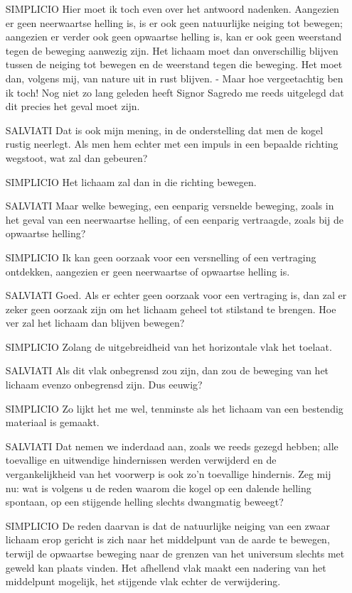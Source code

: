 \documentclass{ximera}
\begin{document}
{\begin{enumerate}
	\item[SIMPLICIO]Hier moet ik toch even over het antwoord nadenken. Aangezien er geen neerwaartse helling is, is er ook geen natuurlijke neiging tot bewegen; aangezien er verder ook geen opwaartse helling is, kan er ook geen weerstand tegen de beweging aanwezig zijn. Het lichaam moet dan onverschillig blijven tussen de neiging tot bewegen en de weerstand tegen die beweging. Het moet dan, volgens mij, van nature uit in rust blijven. - Maar hoe vergeetachtig ben ik toch! Nog niet zo lang geleden heeft Signor Sagredo me reeds uitgelegd dat dit precies het geval moet zijn.
	\item[SALVIATI]Dat is ook mijn mening, in de onderstelling dat men de kogel rustig neerlegt. Als men hem echter met een impuls in een bepaalde richting wegstoot, wat zal dan gebeuren?
	\item[SIMPLICIO]Het lichaam zal dan in die richting bewegen.
	\item[SALVIATI]Maar welke beweging, een eenparig versnelde beweging, zoals in het geval van een neerwaartse helling, of een eenparig vertraagde, zoals bij de opwaartse helling?
	\item[SIMPLICIO]Ik kan geen oorzaak voor een versnelling of een vertraging ontdekken, aangezien er geen neerwaartse of opwaartse helling is.
	\item[SALVIATI]Goed. Als er echter geen oorzaak voor een vertraging is, dan zal er zeker geen oorzaak zijn om het lichaam geheel tot stilstand te brengen. Hoe ver zal het lichaam dan blijven bewegen?
	\item[SIMPLICIO]Zolang de uitgebreidheid van het horizontale vlak het toelaat.
	\item[SALVIATI]Als dit vlak onbegrensd zou zijn, dan zou de beweging van het lichaam evenzo onbegrensd zijn. Dus eeuwig?
	\item[SIMPLICIO]Zo lijkt het me wel, tenminste als het lichaam van een bestendig materiaal is gemaakt.
	\item[SALVIATI]Dat nemen we inderdaad aan, zoals we reeds gezegd hebben; alle toevallige en uitwendige hindernissen werden verwijderd en de vergankelijkheid van het voorwerp is ook zo'n toevallige hindernis. Zeg mij nu: wat is volgens u de reden waarom die kogel op een dalende helling spontaan, op een stijgende helling slechts dwangmatig beweegt?
	\item[SIMPLICIO]De reden daarvan is dat de natuurlijke neiging van een zwaar lichaam erop gericht is zich naar het middelpunt van de aarde te bewegen, terwijl de opwaartse beweging naar de grenzen van het universum slechts met geweld kan plaats vinden. Het afhellend vlak maakt een nadering van het middelpunt mogelijk, het stijgende vlak echter de verwijdering.

\end{enumerate}}
\end{document}
